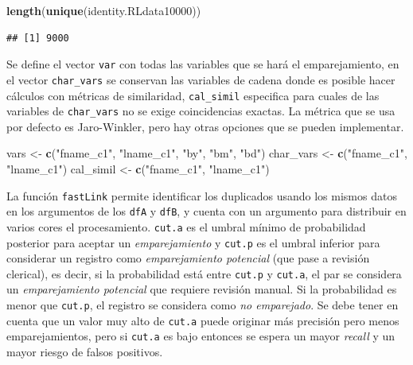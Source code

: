 \documentclass[
  12pt,
]{book}
\newenvironment{Shaded}{\begin{snugshade}}{\end{snugshade}}
\newcommand{\FunctionTok}[1]{\textcolor[rgb]{0.13,0.29,0.53}{\textbf{#1}}}
\newcommand{\NormalTok}[1]{#1}
\newcommand{\OtherTok}[1]{\textcolor[rgb]{0.56,0.35,0.01}{#1}}
\newcommand{\StringTok}[1]{\textcolor[rgb]{0.31,0.60,0.02}{#1}}
\begin{document}
\begin{Shaded}
\begin{Highlighting}[]
\FunctionTok{length}\NormalTok{(}\FunctionTok{unique}\NormalTok{(identity.RLdata10000))}
\end{Highlighting}
\end{Shaded}

\begin{verbatim}
## [1] 9000
\end{verbatim}

Se define el vector \texttt{var} con todas las variables que se hará el emparejamiento, en el vector \texttt{char\_vars} se conservan las variables de cadena donde es posible hacer cálculos con métricas de similaridad, \texttt{cal\_simil} especifica para cuales de las variables de \texttt{char\_vars} no se exige coincidencias exactas. La métrica que se usa por defecto es Jaro-Winkler, pero hay otras opciones que se pueden implementar.

\begin{Shaded}
\begin{Highlighting}[]
\NormalTok{vars }\OtherTok{\textless{}{-}} \FunctionTok{c}\NormalTok{(}\StringTok{"fname\_c1"}\NormalTok{, }\StringTok{"lname\_c1"}\NormalTok{, }\StringTok{"by"}\NormalTok{, }\StringTok{"bm"}\NormalTok{, }\StringTok{"bd"}\NormalTok{)}
\NormalTok{char\_vars }\OtherTok{\textless{}{-}} \FunctionTok{c}\NormalTok{(}\StringTok{"fname\_c1"}\NormalTok{, }\StringTok{"lname\_c1"}\NormalTok{)}
\NormalTok{cal\_simil }\OtherTok{\textless{}{-}} \FunctionTok{c}\NormalTok{(}\StringTok{"fname\_c1"}\NormalTok{, }\StringTok{"lname\_c1"}\NormalTok{)}
\end{Highlighting}
\end{Shaded}

La función \texttt{fastLink} permite identificar los duplicados usando los mismos datos en los argumentos de los \texttt{dfA} y \texttt{dfB}, y cuenta con un argumento para distribuir en varios cores el procesamiento. \texttt{cut.a} es el umbral mínimo de probabilidad posterior para aceptar un \emph{emparejamiento} y \texttt{cut.p} es el umbral inferior para considerar un registro como \emph{emparejamiento potencial} (que pase a revisión clerical), es decir, si la probabilidad está entre \texttt{cut.p} y \texttt{cut.a}, el par se considera un \emph{emparejamiento potencial} que requiere revisión manual. Si la probabilidad es menor que \texttt{cut.p}, el registro se considera como \emph{no emparejado}. Se debe tener en cuenta que un valor muy alto de \texttt{cut.a} puede originar más precisión pero menos emparejamientos, pero si \texttt{cut.a} es bajo entonces se espera un mayor \emph{recall} y un mayor riesgo de falsos positivos.
\end{document}
